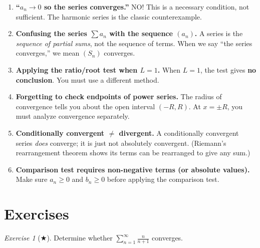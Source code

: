 \documentclass[12pt,a4paper,openany]{book}
\theoremstyle{definition}
\theoremstyle{remark}
\newtheorem{exercise}{Exercise}[chapter]
\begin{document}
\begin{tcolorbox}[
   colback=red!3!white,
   colframe=red!60!black,
   title={\textbf{Common Errors --- Series}},
   fonttitle=\bfseries,
   arc=2mm
]
\begin{enumerate}
\item \textbf{``$a_n \to 0$ so the series converges.''}
      NO! This is a necessary condition, not sufficient. The harmonic series
      is the classic counterexample.

\item \textbf{Confusing the series $\sum a_n$ with the sequence $(a_n)$.}
      A series is the \emph{sequence of partial sums}, not the sequence of
      terms. When we say ``the series converges,'' we mean $(S_n)$ converges.

\item \textbf{Applying the ratio/root test when $L = 1$.}
      When $L = 1$, the test gives \textbf{no conclusion}. You must use a
      different method.

\item \textbf{Forgetting to check endpoints of power series.}
      The radius of convergence tells you about the open interval $(-R,R)$.
      At $x = \pm R$, you must analyze convergence separately.

\item \textbf{Conditionally convergent $\neq$ divergent.}
      A conditionally convergent series \emph{does} converge; it is just not
      absolutely convergent. (Riemann's rearrangement theorem shows its terms
      can be rearranged to give any sum.)

\item \textbf{Comparison test requires non-negative terms (or absolute values).}
      Make sure $a_n \geq 0$ and $b_n \geq 0$ before applying the comparison test.
\end{enumerate}
\end{tcolorbox}

\section{Exercises}\label{sec:series-exercises}

\begin{exercise}[$\bigstar$]\label{exo:series1}
Determine whether $\displaystyle\sum_{n=1}^{\infty}\frac{n}{n+1}$ converges.
\end{exercise}
\end{document}
